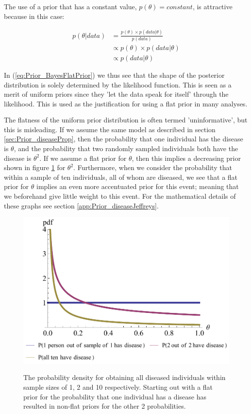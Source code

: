 \documentclass[11pt,fullpage]{book}
\begin{document}
The use of a prior that has a constant value, $p(\theta)=constant$, is attractive because in this case:

\begin{equation}
\begin{align}
p(\theta|data) &= \frac{p(\theta)\times p(data|\theta)}{p(data)}\\
& \propto p(\theta)\times p(data|\theta)\\
& \propto p(data|\theta)
\end{align}
\end{equation}\label{eq:Prior_BayesFlatPrior}

In (\ref{eq:Prior_BayesFlatPrior}) we thus see that the shape of the posterior distribution is solely determined by the likelihood function. This is seen as a merit of uniform priors since they 'let the data speak for itself' through the likelihood. This is used as the justification for using a flat prior in many analyses.

The flatness of the uniform prior distribution is often termed 'uninformative', but this is misleading. If we assume the same model as described in section \ref{sec:Prior_diseaseProp}, then the probability that one individual has the disease is $\theta$, and the probability that two randomly sampled individuals both have the disease is $\theta^2$. If we assume a flat prior for $\theta$, then this implies a decreasing prior shown in figure \ref{fig:Prior_jeffreysIntro} for $\theta^2$. Furthermore, when we consider the probability that within a sample of ten individuals, all of whom are diseased, we see that a flat prior for $\theta$ implies an even more accentuated prior for this event; meaning that we beforehand give little weight to this event. For the mathematical details of these graphs see section \ref{app:Prior_diseaseJeffreys}.

\begin{figure}
\centering
\scalebox{0.75} 
{\includegraphics{Prior_jeffreysIntro.pdf}}\caption{The probability density for obtaining all diseased individuals within sample sizes of 1, 2 and 10 respectively. Starting out with a flat prior for the probability that one individual has a disease has resulted in non-flat priors for the other 2 probabilities.}\label{fig:Prior_jeffreysIntro}
\end{figure}
\end{document}
